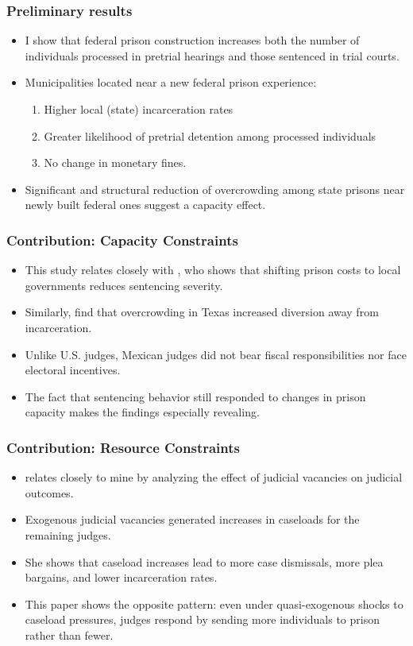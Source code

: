 \documentclass[12pt]{beamer}
\begin{document}
\begin{frame}
\frametitle{Preliminary results}
\small
\begin{itemize}
    \item I show that federal prison construction increases both the number of individuals processed in pretrial hearings and those sentenced in trial courts.
    \item Municipalities located near a new federal prison experience:
    \begin{enumerate}
        \item Higher local (state) incarceration rates
        \item Greater likelihood of pretrial detention among processed individuals
        \item No change in monetary fines.
    \end{enumerate} 
    \item Significant and structural reduction of overcrowding among state prisons near newly built federal ones suggest a capacity effect.

\end{itemize}
\end{frame}

\begin{frame}
\frametitle{Contribution: Capacity Constraints}
\small
\begin{itemize}
    \item This study relates closely with \citep{Ouss-Incentives}, who shows that shifting prison costs to local governments reduces sentencing severity.
    \item Similarly, \citep{Schnepel} find that overcrowding in Texas increased diversion away from incarceration. 
    \item Unlike U.S. judges, Mexican judges did not bear fiscal responsibilities nor face electoral incentives. 
    \item The fact that sentencing behavior still responded to changes in prison capacity makes the findings especially revealing.
\end{itemize}
\end{frame}

\begin{frame}
\frametitle{Contribution: Resource Constraints}
\small
\begin{itemize}
    \item \cite{Yang-Resource-AEJ} relates closely to mine by analyzing the effect of judicial vacancies on judicial outcomes.
    \item Exogenous judicial vacancies generated increases in caseloads for the remaining judges.
    \item She shows that caseload increases  lead to more case dismissals, more plea bargains, and lower incarceration rates.
    \item This paper shows the opposite pattern: even under quasi-exogenous shocks to caseload pressures, judges respond by sending more individuals to prison rather than fewer.
\end{itemize}
\end{frame}
\end{document}
